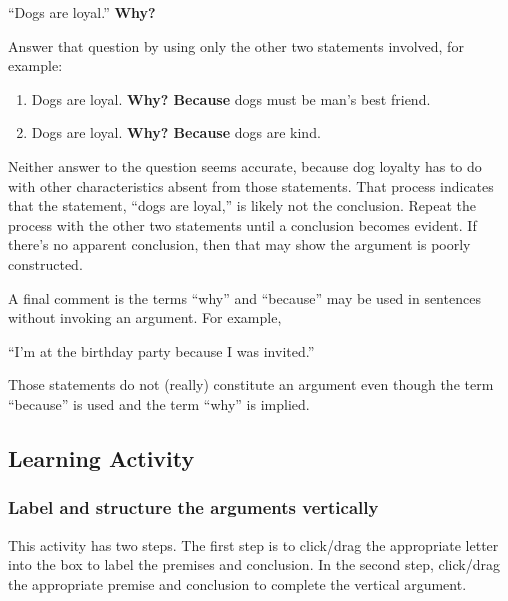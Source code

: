 \documentclass[
]{book}
\providecommand{\tightlist}{%
  \setlength{\itemsep}{0pt}\setlength{\parskip}{0pt}}
\begin{document}
``Dogs are loyal.'' \textbf{Why?}

Answer that question by using only the other two statements involved, for example:

\begin{enumerate}
\def\labelenumi{\arabic{enumi}.}
\tightlist
\item
  Dogs are loyal. \textbf{Why? Because} dogs must be man's best friend.\\
\item
  Dogs are loyal. \textbf{Why? Because} dogs are kind.
\end{enumerate}

Neither answer to the question seems accurate, because dog loyalty has to do with other characteristics absent from those statements. That process indicates that the statement, ``dogs are loyal,'' is likely not the conclusion. Repeat the process with the other two statements until a conclusion becomes evident. If there's no apparent conclusion, then that may show the argument is poorly constructed.

A final comment is the terms ``why'' and ``because'' may be used in sentences without invoking an argument. For example,

``I'm at the birthday party because I was invited.''

Those statements do not (really) constitute an argument even though the term ``because'' is used and the term ``why'' is implied.

\hypertarget{learning-activity-3}{%
\subsection*{Learning Activity}\label{learning-activity-3}}

\hypertarget{label-and-structure-the-arguments-vertically}{%
\subsubsection*{Label and structure the arguments vertically}\label{label-and-structure-the-arguments-vertically}}

This activity has two steps. The first step is to click/drag the appropriate letter into the box to label the premises and conclusion. In the second step, click/drag the appropriate premise and conclusion to complete the vertical argument.
\end{document}
